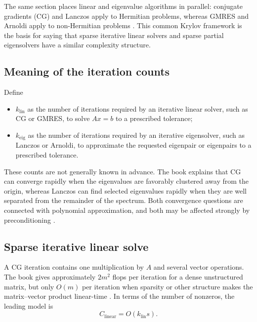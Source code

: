 \documentclass[11pt,a4paper]{article}
\begin{document}
The same section places linear and eigenvalue algorithms in parallel:
conjugate gradients (CG) and Lanczos apply to Hermitian problems, whereas
GMRES and Arnoldi apply to non-Hermitian problems
\cite[pp.~245--246]{trefethenbau}.  This common Krylov framework is the basis
for saying that sparse iterative linear solvers and sparse partial eigensolvers
have a similar complexity structure.

\subsection{Meaning of the iteration counts}

Define
\begin{itemize}
  \item $k_{\mathrm{lin}}$ as the number of iterations required by an
        iterative linear solver, such as CG or GMRES, to solve $Ax=b$ to a
        prescribed tolerance;
  \item $k_{\mathrm{eig}}$ as the number of iterations required by an
        iterative eigensolver, such as Lanczos or Arnoldi, to approximate the
        requested eigenpair or eigenpairs to a prescribed tolerance.
\end{itemize}

These counts are not generally known in advance.  The book explains that CG
can converge rapidly when the eigenvalues are favorably clustered away from
the origin, whereas Lanczos can find selected eigenvalues rapidly when they are
well separated from the remainder of the spectrum.  Both convergence questions
are connected with polynomial approximation, and both may be affected strongly
by preconditioning \cite[p.~246]{trefethenbau}.

\subsection{Sparse iterative linear solve}

A CG iteration contains one multiplication by $A$ and several vector
operations.  The book gives approximately $2m^2$ flops per iteration for a
dense unstructured matrix, but only $O(m)$ per iteration when sparsity or other
structure makes the matrix--vector product linear-time
\cite[p.~295]{trefethenbau}.  In terms of the number of nonzeros, the leading
model is
\begin{equation}
  C_{\mathrm{linear}}=O\!\left(k_{\mathrm{lin}}s\right).
  \label{eq:linear-sparse}
\end{equation}
\end{document}

